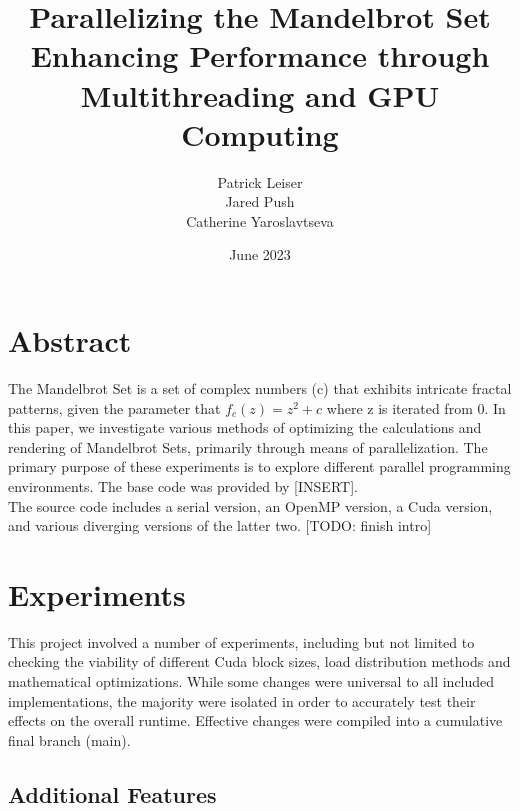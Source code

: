 \documentclass{article}
\begin{document}
\title{\textbf{Parallelizing the Mandelbrot Set \\ \large Enhancing Performance through Multithreading and GPU Computing}}
\author{\begin{tabular}{cc}Patrick Leiser\\
Jared Push\\Catherine Yaroslavtseva\\\end{tabular}}

\date{June 2023}

\maketitle

\section{Abstract}

The Mandelbrot Set is a set of complex numbers (c) that exhibits intricate fractal patterns, given the parameter that $f_c(z) = z^2 + c$ where z is iterated from 0. In this paper, we investigate various methods of optimizing  the calculations and rendering of Mandelbrot Sets, primarily through means of parallelization. The primary purpose of these experiments is to explore different parallel programming environments. The base code was provided by [INSERT]. \\ 

The source code includes a serial version, an OpenMP version, a Cuda version, and various diverging versions of the latter two. [TODO: finish intro]

\section{Experiments}

This project involved a number of experiments, including but not limited to checking the viability of different Cuda block sizes, load distribution methods and mathematical optimizations. While some changes were universal to all included implementations, the majority were isolated in order to accurately test their effects on the overall runtime. Effective changes were compiled into a cumulative final branch (main).

\subsection{Additional Features}
\end{document}
